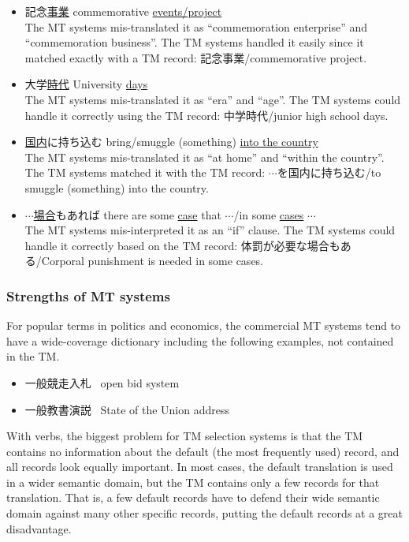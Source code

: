 \begin{itemize}
\item 記念\underline{事業} commemorative \underline{events/project} \\
  The MT systems mis-translated it as ``commemoration enterprise'' and
  ``commemoration business''.  The TM systems handled it easily since
  it matched exactly with a TM record: 記念事業/commemorative project.

 \item 大学\underline{時代} University \underline{days} \\
       The MT systems mis-translated it as ``era'' and ``age''. 
       The TM systems could handle it correctly using the TM record: 
       中学時代/junior high school days.

 \item \underline{国内}に持ち込む bring/smuggle (something) 
       \underline{into the country} \\
       The MT systems mis-translated it as ``at home'' and ``within the
       country''.  The TM systems matched it with the TM record: 
       $\cdots$を国内に持ち込む/to smuggle (something) into the country.

 \item $\cdots$\underline{場合}もあれば
       there are some \underline{case} that $\cdots$/in some 
       \underline{cases} $\cdots$\\
       The MT systems mis-interpreted it as an ``if'' clause. 
       The TM systems could handle it correctly based on the 
       TM record: 体罰が必要な場合もある/Corporal punishment is needed
       in some cases.
\end{itemize}




\subsubsection{Strengths of MT systems}

For popular terms in politics and economics, the commercial MT systems
tend to have a wide-coverage dictionary including the following 
examples, not contained in the TM.
\begin{itemize}
 \item 一般競走入札 \ open bid system
 \item 一般教書演説 \ State of the Union address
\end{itemize}


With verbs, the biggest problem for TM selection systems is that the TM
contains  no information about the default (the most frequently used)
record, and all records look equally important.  In most cases, the
default translation is used in a wider semantic domain, but the TM
contains only a few records for that translation. That is, a few default
records have to defend their wide semantic domain against many other
specific records, putting the default records at a great disadvantage.



